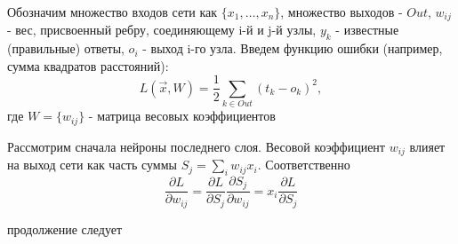 		Обозначим множество входов сети как $\{x_1, \ldots, x_n\}$, множество выходов - $Out$, $w_{ij}$ - вес, присвоенный ребру, соединяющему i-й и j-й узлы, $y_k$ - известные (правильные) ответы, $o_i$ - выход i-го узла. Введем функцию ошибки (например, сумма квадратов расстояний):
		$$ L(\vec{x}, W) = \frac{1}{2} \sum_{k \in Out} (t_k - o_k)^2, $$
		где $W = \{w_{ij}\}$ - матрица весовых коэффициентов
		
		Рассмотрим сначала нейроны последнего слоя. Весовой коэффициент $w_{ij}$ влияет на выход сети как часть суммы $S_j = \sum_i w_{ij} x_i$. Соответственно
		$$ \frac{\partial L}{\partial w_{ij}} = \frac{\partial L}{\partial S_j} \frac{\partial S_j}{\partial w_{ij}} = x_i \frac{\partial L}{\partial S_j} $$
		
		продолжение следует
		
